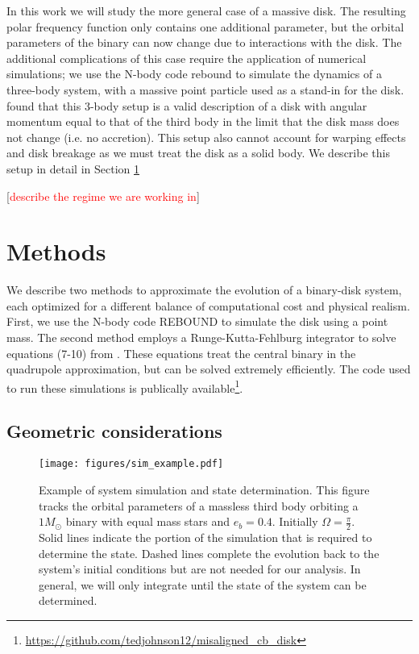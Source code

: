 \documentclass[twocolumn]{aastex631}
\newcommand\codeurl[0]{\url{https://github.com/tedjohnson12/misaligned_cb_disk}}
\newcommand\question[1]{[\textcolor{red}{#1}]}
\begin{document}
In this work we will study the more general case of a massive disk. The resulting polar frequency function only contains one
additional parameter, but the orbital parameters of the binary can now change due to interactions with the disk. The additional
complications of this case require the application of numerical simulations; we use the N-body code {\sc rebound} \citep{rebound} to simulate the
dynamics of a three-body system, with a massive point particle used as a stand-in for the disk. \citet{abod2022} found that this 3-body
setup is a valid description of a disk with angular momentum equal to that of the third body in the limit that the disk mass does not change
(i.e. no accretion). This setup also cannot account for warping effects and disk breakage as we must treat the disk as a solid body. 
We describe this setup in detail in Section \ref{sec:methods}

\question{describe the regime we are working in}


\section{Methods}
\label{sec:methods}
We describe two methods to approximate the evolution of a binary-disk system, each optimized for a different balance of computational cost and physical realism.
First, we use the N-body code {\sc REBOUND} \citep{rebound} to simulate the disk using a point mass. The second method employs a Runge-Kutta-Fehlburg integrator to solve
equations (7-10) from \citet{martin2019}. These equations treat the central binary in the quadrupole approximation, but can be solved extremely efficiently.
The code used to run these simulations is publically available\footnote{\codeurl}.

\subsection{Geometric considerations}
\label{subsec:setup}

\begin{figure}
    \begin{centering}
        \texttt{[image: figures/sim\_example.pdf]}
        \caption{Example of system simulation and state determination. This figure tracks the orbital parameters
        of a massless third body orbiting a $1 M_\odot$ binary with equal mass stars and $e_b = 0.4$.
        Initially $\Omega = \frac{\pi}{2}$.
        Solid lines indicate
        the portion of the simulation that is required to determine the state. Dashed lines complete the evolution back to the system's
        initial conditions but are not needed for our analysis. In general, we will only integrate until the state of the system can be
        determined.}
        \label{fig:sim_example}
    \end{centering}
\end{figure}
\end{document}
